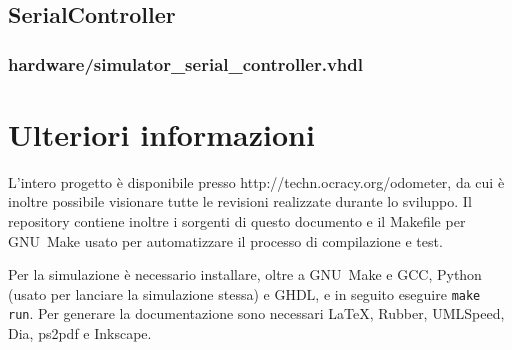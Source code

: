\documentclass [11pt,a4paper,oneside]{paper}
\newcommand{\href}[2]{#2}
\newcommand{\link}[1]{\href{#1}{#1}}
\newcommand{\inputVHDL}[1]{}
\begin{document}
\subsection{SerialController}
\subsubsection{hardware/simulator\_serial\_controller.vhdl}
\inputVHDL{hardware/simulator_serial_controller.vhdl}


\section{Ulteriori informazioni}
L'intero progetto è disponibile presso \link{http://techn.ocracy.org/odometer}, da cui
è inoltre possibile visionare tutte le revisioni realizzate durante lo sviluppo.
Il repository contiene inoltre i sorgenti di questo documento e il Makefile
per GNU~Make usato per automatizzare il processo di compilazione e test.

Per la simulazione è necessario installare, oltre a GNU~Make e GCC, Python
(usato per lanciare la simulazione stessa) e GHDL, e in seguito eseguire
\texttt{make run}. Per generare la documentazione sono necessari \LaTeX,
Rubber, UMLSpeed, Dia, ps2pdf e Inkscape.
\end{document}
